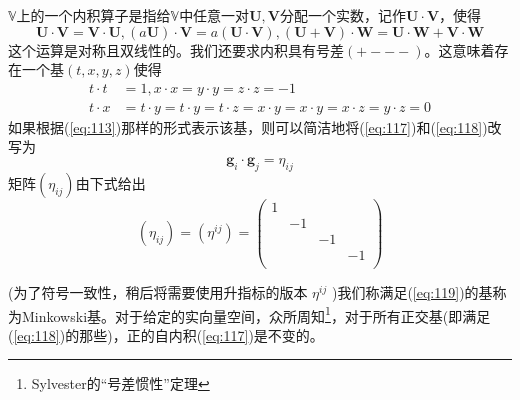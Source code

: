 \documentclass[utf8]{ctexbook}
\numberwithin{equation}{section}
\begin{document}
$\mathbb{V}$上的一个内积算子是指给$\mathbb{V}$中任意一对$\mathbf{U},\mathbf{V}$分配一个实数，记作$\mathbf{U} \cdot \mathbf{V}$，使得
\begin{equation}
    \mathbf{U}\cdot \mathbf{V}=\mathbf{V}\cdot \mathbf{U},(a\mathbf{U})\cdot \mathbf{V}=a(\mathbf{U}\cdot \mathbf{V}),(\mathbf{U}+\mathbf{V})\cdot \mathbf{W}=\mathbf{U}\cdot \mathbf{W}+ \mathbf{V}\cdot \mathbf{W}
\end{equation}
这个运算是对称且双线性的。我们还要求内积具有号差$(+---)$。这意味着存在一个基$(t,x,y,z)$使得
\begin{align}
    t\cdot t&=1,x\cdot x=y\cdot y=z\cdot z =-1\label{eq:117}\\
    t\cdot x&=t\cdot y =t\cdot y=t\cdot z = x\cdot y = x\cdot y =x\cdot z =y\cdot z=0\label{eq:118}
\end{align}
如果根据(\ref{eq:113})那样的形式表示该基，则可以简洁地将(\ref{eq:117})和(\ref{eq:118})改写为
\begin{equation}
    \mathbf{g}_i \cdot \mathbf{g}_j=\eta_{ij} \label{eq:119}
\end{equation}
矩阵$(\eta_{ij})$由下式给出
\begin{equation}
    (\eta_{ij})=(\eta^{ij})=\begin{pmatrix}
        1&&&\\
        &-1&&\\
        &&-1&\\
        &&&-1\\
    \end{pmatrix}
    \label{eq:1110}
\end{equation}

(为了符号一致性，稍后将需要使用升指标的版本 $\eta^{ij}$ )我们称满足(\ref{eq:119})的基称为Minkowski基。对于给定的实向量空间，众所周知\footnote{Sylvester的“号差惯性”定理}，对于所有正交基(即满足(\ref{eq:118})的那些)，正的自内积(\ref{eq:117})是不变的。
\end{document}
